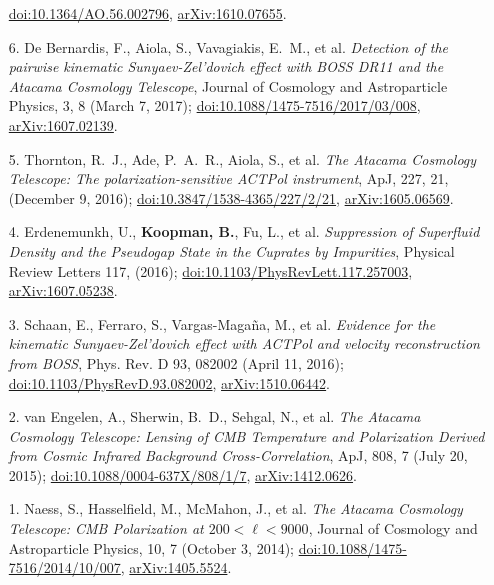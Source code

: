 \documentclass[margin,line]{res}
\begin{document}
\begin{resume}
\begin{enumerate}
    \href{http://dx.doi.org/10.1364/AO.56.002796}{doi:10.1364/AO.56.002796},
    \href{https://arxiv.org/abs/1610.07655}{arXiv:1610.07655}.
\item[{6.}] De Bernardis, F., Aiola, S., Vavagiakis, E.~M., et al.
    \textit{Detection of the pairwise kinematic Sunyaev-Zel'dovich effect with BOSS
    DR11 and the Atacama Cosmology Telescope},
    Journal of Cosmology and Astroparticle Physics, 3, 8 (March 7, 2017);
    \href{http://dx.doi.org/10.1088/1475-7516/2017/03/008}{doi:10.1088/1475-7516/2017/03/008},
    \href{https://arxiv.org/abs/1607.02139}{arXiv:1607.02139}.
\item[{5.}] Thornton, R.~J., Ade, P.~A.~R., Aiola, S., et al. \textit{The
    Atacama Cosmology Telescope: The polarization-sensitive ACTPol instrument}, ApJ, 227, 21,
    (December 9, 2016);
    \href{http://dx.doi.org/10.3847/1538-4365/227/2/21}{doi:10.3847/1538-4365/227/2/21},
    \href{https://arxiv.org/abs/1605.06569}{arXiv:1605.06569}.
\item[{4.}] Erdenemunkh, U., \textbf{Koopman, B.}, Fu, L., et al. \textit{Suppression of
    Superfluid Density and the Pseudogap State in the Cuprates by Impurities},
    Physical Review Letters 117, (2016);
    \href{https://journals.aps.org/prl/abstract/10.1103/PhysRevLett.117.257003}{doi:10.1103/PhysRevLett.117.257003},
    \href{https://arxiv.org/abs/1607.05238}{arXiv:1607.05238}.
\item[{3.}] Schaan, E., Ferraro, S., Vargas-Maga{\~n}a, M., et al.
    \textit{Evidence for the kinematic Sunyaev-Zel'dovich effect with ACTPol and
    velocity reconstruction from BOSS}, Phys. Rev. D 93, 082002 (April 11, 2016);
    \href{http://journals.aps.org/prd/abstract/10.1103/PhysRevD.93.082002}{doi:10.1103/PhysRevD.93.082002},
    \href{http://arxiv.org/abs/1510.06442}{arXiv:1510.06442}.
\item[{2.}] van Engelen, A., Sherwin, B.~D., Sehgal, N., et al.  \textit{The
    Atacama Cosmology Telescope: Lensing of CMB Temperature and Polarization
    Derived from Cosmic Infrared Background Cross-Correlation}, ApJ, 808, 7 (July
    20, 2015);
    \href{http://dx.doi.org/10.1088/0004-637X/808/1/7}{doi:10.1088/0004-637X/808/1/7},
    \href{http://arxiv.org/abs/1412.0626}{arXiv:1412.0626}.
\item[{1.}] Naess, S., Hasselfield, M., McMahon, J., et al. 
    \textit{The Atacama Cosmology Telescope: CMB Polarization at $200<\ell<9000$},
    Journal of Cosmology and Astroparticle Physics, 10, 7 (October 3, 2014); 
    \href{http://dx.doi.org/10.1088/1475-7516/2014/10/007}{doi:10.1088/1475-7516/2014/10/007}, 
    \href{http://arxiv.org/abs/1405.5524}{arXiv:1405.5524}.
\end{enumerate}


\end{resume}
\end{document}
